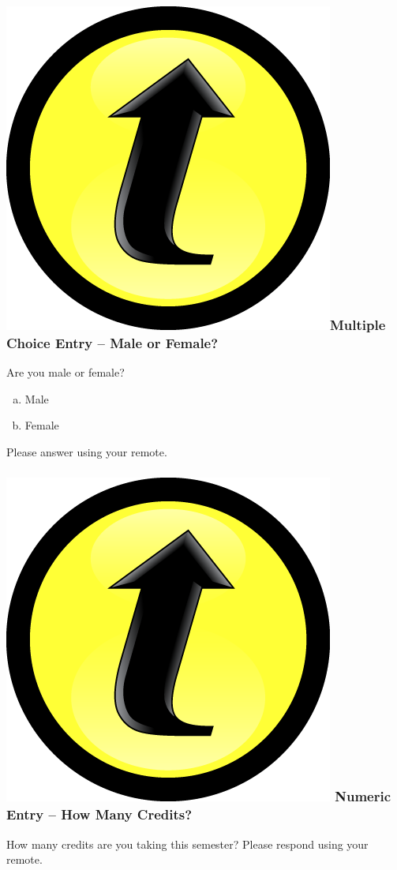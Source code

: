 \documentclass[handout]{beamer}
\begin{document}
\begin{frame}

\frametitle{\includegraphics[scale = 0.05]{./images/clicker}\hfill  Multiple Choice Entry -- Male or Female?}
Are you male or female?
\begin{enumerate}[(a)]
	\item Male
	\item Female
\end{enumerate}
Please answer using your remote.

\end{frame}

\begin{frame}

\frametitle{\includegraphics[scale = 0.05]{./images/clicker} \hfill  Numeric Entry -- How Many Credits?}

How many credits are you taking this semester? Please respond using your remote.

\end{frame}
\end{document}
